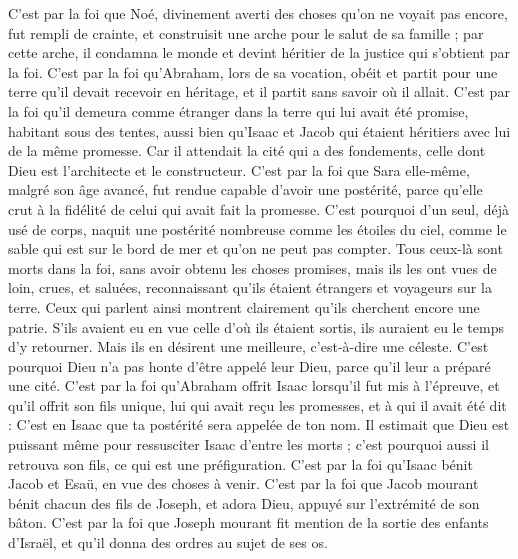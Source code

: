 \begin{multicols}{2}
C’est par la foi que Noé, divinement averti des choses qu’on ne voyait pas encore, fut rempli de crainte, et construisit une arche pour le salut de sa famille ; par cette arche, il condamna le monde et devint héritier de la justice qui s’obtient par la foi.
C’est par la foi qu’Abraham, lors de sa vocation, obéit et partit pour une terre qu'il devait recevoir en héritage, et il partit sans savoir où il allait.
C’est par la foi qu’il demeura comme étranger dans la terre qui lui avait été promise, habitant sous des tentes, aussi bien qu’Isaac et Jacob qui étaient héritiers avec lui de la même promesse.
Car il attendait la cité qui a des fondements, celle dont Dieu est l'architecte et le constructeur.
C’est par la foi que Sara elle-même, malgré son âge avancé, fut rendue capable d’avoir une postérité, parce qu’elle crut à la fidélité de celui qui avait fait la promesse.
C'est pourquoi d'un seul, déjà usé de corps, naquit une postérité nombreuse comme les étoiles du ciel, comme le sable qui est sur le bord de mer et qu’on ne peut pas compter.
Tous ceux-là sont morts dans la foi, sans avoir obtenu les choses promises, mais ils les ont vues de loin, crues, et saluées, reconnaissant qu'ils étaient étrangers et voyageurs sur la terre.
Ceux qui parlent ainsi montrent clairement qu'ils cherchent encore une patrie.
S’ils avaient eu en vue celle d’où ils étaient sortis, ils auraient eu le temps d’y retourner.
Mais ils en désirent une meilleure, c'est-à-dire une céleste. C’est pourquoi Dieu n’a pas honte d'être appelé leur Dieu, parce qu'il leur a préparé une cité.
C’est par la foi qu’Abraham offrit Isaac lorsqu’il fut mis à l’épreuve, et qu’il offrit son fils unique, lui qui avait reçu les promesses,
et à qui il avait été dit : C’est en Isaac que ta postérité sera appelée de ton nom.
Il estimait que Dieu est puissant même pour ressusciter Isaac d'entre les morts ; c'est pourquoi aussi il retrouva son fils, ce qui est une préfiguration.
C’est par la foi qu’Isaac bénit Jacob et Esaü, en vue des choses à venir.
C’est par la foi que Jacob mourant bénit chacun des fils de Joseph, et adora Dieu, appuyé sur l’extrémité de son bâton.
C’est par la foi que Joseph mourant fit mention de la sortie des enfants d'Israël, et qu’il donna des ordres au sujet de ses os.

\end{multicols}
